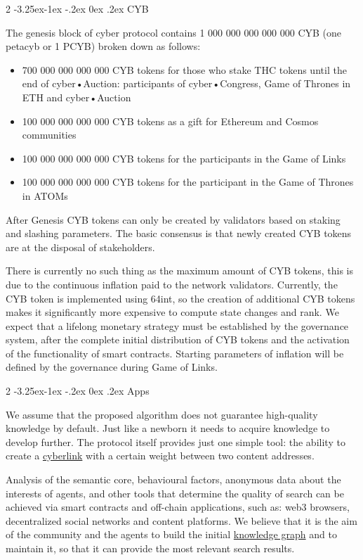 \documentclass[8pt,oneside]{amsart}
\makeatletter
\renewcommand\subsection{\@startsection{subsection}
                                    {2}{\z@}
                                    {-3.25ex\@plus -1ex \@minus -.2ex}
                                    {0ex \@plus .2ex}
                                    {\play\Large}
                        }
\newcommand{\titleSection}[1]{\subsection{#1}}
\newcommand{\code}[1]{{\PlayBold #1}}
\newenvironment{Figure}
  {\par\medskip\noindent\minipage{\linewidth}}
  {\endminipage\par\medskip}
\makeatother
\begin{document}
\titleSection{CYB}\label{cyb}

The genesis block of \code{cyber} protocol contains 1 000 000 000 000 000 CYB (one petacyb or 1 PCYB) broken down as follows:

\begin{itemize}
\item 700 000 000 000 000 CYB tokens for those who stake THC tokens until the end of cyber•Auction: participants of cyber•Congress, Game of Thrones in ETH and cyber•Auction
\item 100 000 000 000 000 CYB tokens as a gift for Ethereum and Cosmos communities
\item 100 000 000 000 000 CYB tokens for the participants in the Game of Links
\item 100 000 000 000 000 CYB tokens for the participant in the Game of Thrones in ATOMs
\end{itemize}

\begin{Figure}
 \centering
 
\end{Figure}

After Genesis CYB tokens can only be created by validators based on staking and slashing parameters. The basic consensus is that newly created CYB tokens are at the disposal of stakeholders.

There is currently no such thing as the maximum amount of CYB tokens, this is due to the continuous inflation paid to the network validators. Currently, the CYB token is implemented using 64int, so the creation of additional CYB tokens makes it significantly more expensive to compute state changes and rank. We expect that a lifelong monetary strategy must be established by the governance system, after the complete initial distribution of CYB tokens and the activation of the functionality of smart contracts. Starting parameters of inflation will be defined by the governance during Game of Links.

\titleSection{Apps}\label{apps}

We assume that the proposed algorithm does not guarantee high-quality knowledge by default. Just like a newborn it needs to acquire knowledge to develop further. The protocol itself provides just one simple tool: the ability to create a {\hyperref[cyberlinks]{cyberlink}} with a certain weight between two content addresses.

Analysis of the semantic core, behavioural factors, anonymous data about the interests of agents, and other tools that determine the quality of search can be achieved via smart contracts and off-chain applications, such as: web3 browsers, decentralized social networks and content platforms. We believe that it is the aim of the community and the agents to build the initial {\hyperref[knowledge-graph]{knowledge graph}} and to maintain it, so that it can provide the most relevant search results.
\end{document}
